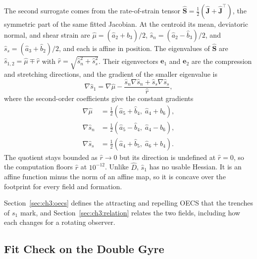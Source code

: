 The second surrogate comes from the rate-of-strain tensor
$\hat{\mathbf{S}} = \tfrac{1}{2}(\hat{\mathbf{J}} + \hat{\mathbf{J}}^{\top})$,
the symmetric part of the same fitted Jacobian.
At the centroid its mean, deviatoric normal, and shear strain are
$\hat{\mu} = (\hat{a}_2 + \hat{b}_3)/2$,
$\hat{s}_n = (\hat{a}_2 - \hat{b}_3)/2$, and
$\hat{s}_s = (\hat{a}_3 + \hat{b}_2)/2$, and each is affine in position.
The eigenvalues of $\hat{\mathbf{S}}$ are
$\hat{s}_{1,2} = \hat{\mu} \mp \hat{r}$ with
$\hat{r} = \sqrt{\hat{s}_n^2 + \hat{s}_s^2}$. Their eigenvectors
$\mathbf{e}_1$ and $\mathbf{e}_2$ are the compression and stretching
directions, and the gradient of the smaller eigenvalue is
\begin{equation}
    \nabla\hat{s}_1 = \nabla\hat{\mu}
        - \frac{\hat{s}_n\nabla\hat{s}_n + \hat{s}_s\nabla\hat{s}_s}{\hat{r}},
    \label{eq:ch7:grad_s1}
\end{equation}
where the second-order coefficients give the constant gradients
\begin{equation}
    \begin{aligned}
        \nabla\hat{\mu} &= \tfrac{1}{2}(\hat{a}_5 + \hat{b}_4,\; \hat{a}_4 + \hat{b}_6), \\
        \nabla\hat{s}_n &= \tfrac{1}{2}(\hat{a}_5 - \hat{b}_4,\; \hat{a}_4 - \hat{b}_6), \\
        \nabla\hat{s}_s &= \tfrac{1}{2}(\hat{a}_4 + \hat{b}_5,\; \hat{a}_6 + \hat{b}_4).
    \end{aligned}
    \label{eq:ch7:grad_strain}
\end{equation}
The quotient stays bounded as $\hat{r} \to 0$ but its direction is
undefined at $\hat{r} = 0$, so the computation floors $\hat{r}$ at
$10^{-12}$. Unlike $\hat{D}$, $\hat{s}_1$ has no usable Hessian. It is an
affine function minus the norm of an affine map, so it is concave over the
footprint for every field and formation.

Section~\ref{sec:ch3:oecs} defines the attracting and repelling OECS
that the trenches of $s_1$ mark, and Section~\ref{sec:ch3:relation}
relates the two fields, including how each changes for a rotating
observer.

\subsection{Fit Check on the Double Gyre}
\label{sec:ch7:fit_check}


